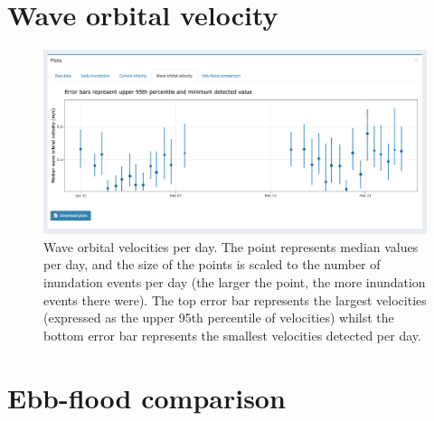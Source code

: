 \documentclass[
  letterpaper,
  DIV=11,
  numbers=noendperiod]{scrreprt}
\begin{document}
\section{Wave orbital velocity}

\begin{figure}

{\centering \includegraphics[width=1\textwidth,height=\textheight]{chapters/figs/WaveData.png}

}

\caption{Wave orbital velocities per day. The point represents median
values per day, and the size of the points is scaled to the number of
inundation events per day (the larger the point, the more inundation
events there were). The top error bar represents the largest velocities
(expressed as the upper 95th percentile of velocities) whilst the bottom
error bar represents the smallest velocities detected per day.}

\end{figure}

\section{Ebb-flood comparison}
\end{document}
